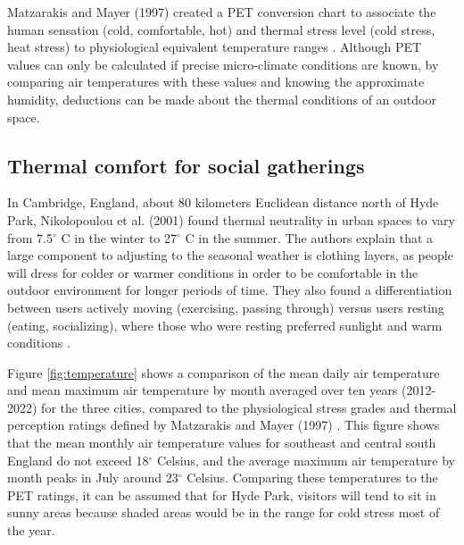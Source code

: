 \begin{multicols}{2}

Matzarakis and Mayer (1997) created a PET conversion chart to associate the human sensation (cold, comfortable, hot) and thermal stress level (cold stress, heat stress) to physiological equivalent temperature ranges \cite{matzarakis_urban_1997}. Although PET values can only be calculated if precise micro-climate conditions are known, by comparing air temperatures with these values and knowing the approximate humidity, deductions can be made about the thermal conditions of an outdoor space. 

\subsection{Thermal comfort for social gatherings}
In Cambridge, England, about 80 kilometers Euclidean distance north of Hyde Park, Nikolopoulou et al. (2001) found thermal neutrality in urban spaces to vary from 7.5$^{\circ}$ C in the winter to 27$^{\circ}$ C in the summer. The authors explain that a large component to adjusting to the seasonal weather is clothing layers, as people will dress for colder or warmer conditions in order to be comfortable in the outdoor environment for longer periods of time. They also found a differentiation between users actively moving (exercising, passing through) versus users resting (eating, socializing), where those who were resting preferred sunlight and warm conditions \cite{nikolopoulou_thermal_2001}.

Figure \ref{fig:temperature} shows a comparison of the mean daily air temperature and mean maximum air temperature by month averaged over ten years (2012-2022) for the three cities, compared to the physiological stress grades and thermal perception ratings defined by Matzarakis and Mayer (1997) \cite{matzarakis_urban_1997}. This figure shows that the mean monthly air temperature values for southeast and central south England do not exceed 18$^{\circ}$ Celsius, and the average maximum air temperature by month peaks in July around 23$^{\circ}$ Celsius. Comparing these temperatures to the PET ratings, it can be assumed that for Hyde Park, visitors will tend to sit in sunny areas because shaded areas would be in the range for cold stress most of the year. 


\end{multicols}
